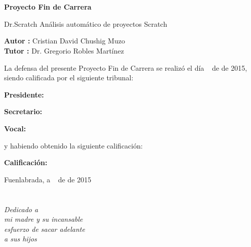 \documentclass[a4paper, 12pt]{book}
\begin{document}
\newpage
\mbox{}
\thispagestyle{empty} %

\clearpage
{}
\chapter*{}

\vspace{-4cm}
\begin{center}
\LARGE
\textbf{Proyecto Fin de Carrera}

\vspace{1cm}
\large
Dr.Scratch Análisis automático de proyectos Scratch

\vspace{1cm}
\large
\textbf{Autor :} Cristian David Chushig Muzo \\
\textbf{Tutor :} Dr. Gregorio Robles Martínez

\end{center}

\vspace{1cm}
La defensa del presente Proyecto Fin de Carrera se realizó el día \qquad$\;\,$ 
de \qquad\qquad\qquad\qquad \newline de 2015, siendo calificada por el siguiente tribunal:


\vspace{0.5cm}
\textbf{Presidente:}

\vspace{1.2cm}
\textbf{Secretario:}

\vspace{1.2cm}
\textbf{Vocal:}


\vspace{1.2cm}
y habiendo obtenido la siguiente calificación:

\vspace{1cm}
\textbf{Calificación:}


\vspace{1cm}
\begin{flushright}
Fuenlabrada, a \qquad$\;\,$ de \qquad\qquad\qquad\qquad de 2015
\end{flushright}



\chapter*{}
\begin{flushright}
\textit{Dedicado a \\
mi madre y su incansable  \\
esfuerzo de sacar adelante \\
a sus hijos}
\end{flushright}
\end{document}
